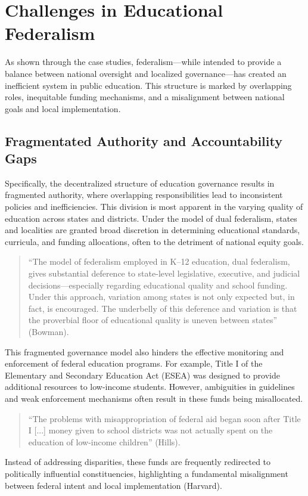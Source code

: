 \documentclass[11pt]{extarticle}
\begin{document}
\section{Challenges in Educational Federalism}
As shown through the case studies, federalism---while intended to provide a balance between national oversight and localized governance---has created an inefficient system in public education. This structure is marked by overlapping roles, inequitable funding mechanisms, and a misalignment between national goals and local implementation. 
\subsection{Fragmentated Authority and Accountability Gaps}
Specifically, the decentralized structure of education governance results in fragmented authority, where overlapping responsibilities lead to inconsistent policies and inefficiencies. This division is most apparent in the varying quality of education across states and districts. Under the model of dual federalism, states and localities are granted broad discretion in determining educational standards, curricula, and funding allocations, often to the detriment of national equity goals.
\begin{quote}
``The model of federalism employed in K–12 education, dual federalism, gives substantial deference to state-level legislative, executive, and judicial decisions—especially regarding educational quality and school funding. Under this approach, variation among states is not only expected but, in fact, is encouraged. The underbelly of this deference and variation is that the proverbial floor of educational quality is uneven between states” (Bowman).
\end{quote}
This fragmented governance model also hinders the effective monitoring and enforcement of federal education programs. For example, Title I of the Elementary and Secondary Education Act (ESEA) was designed to provide additional resources to low-income students. However, ambiguities in guidelines and weak enforcement mechanisms often result in these funds being misallocated.
\begin{quote}
``The problems with misappropriation of federal aid began soon after Title I [...] money given to school districts was not actually spent on the education of low-income children” (Hills).
\end{quote}
Instead of addressing disparities, these funds are frequently redirected to politically influential constituencies, highlighting a fundamental misalignment between federal intent and local implementation (Harvard).
\end{document}
